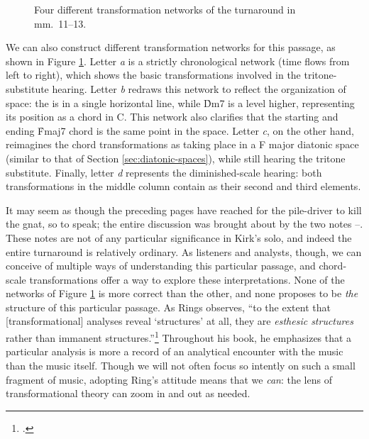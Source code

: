 \begin{figure}[p]
  \caption{Four different transformation networks of the turnaround in
    mm.~11--13.}
  \label{csa:turnaround-trans-networks}
\end{figure}

We can also construct different transformation networks for this passage, as
shown in Figure \ref{csa:turnaround-trans-networks}. Letter \emph{a}
is a strictly chronological network (time flows from left to right), which
shows the basic transformations involved in the tritone-substitute hearing.
Letter \emph{b} redraws this network to reflect the organization of \tf space:
the \tfo is in a single horizontal line, while \h{Dm7} is a level higher,
representing its position as a \ii chord in C. This network also clarifies that
the starting and ending \h{Fmaj7} chord is the same point in the space. Letter
\emph{c}, on the other hand, reimagines the chord transformations as taking
place in a F major diatonic space (similar to that of Section
\ref{sec:diatonic-spaces}), while still hearing the tritone substitute.
Finally, letter \emph{d} represents the diminished-scale hearing: both
transformations in the middle column contain  as their
second and third elements.


It may seem as though the preceding pages have reached for the pile-driver to
kill the gnat, so to speak; the entire discussion was brought about by the two
notes \Eflat--\Dflat. These notes are not of any particular
significance in Kirk's solo, and indeed the entire turnaround is relatively
ordinary. As listeners and analysts, though, we can conceive of multiple ways
of understanding this particular passage, and chord-scale transformations
offer a way to explore these interpretations. None of the networks of Figure
\ref{csa:turnaround-trans-networks} is more correct than the other, and none
proposes to be \emph{the} structure of this particular passage. As Rings
observes, ``to the extent that [transformational] analyses reveal `structures'
at all, they are \emph{esthesic structures} rather than immanent
structures.''\footcite[37, emphasis original]{rings:2011} Throughout his book,
he emphasizes that a particular analysis is more a record of an analytical
encounter with the music than the music itself. Though we will not often focus
so intently on such a small fragment of music, adopting Ring's attitude means
that we \emph{can}: the lens of transformational theory can zoom in and out as
needed.

